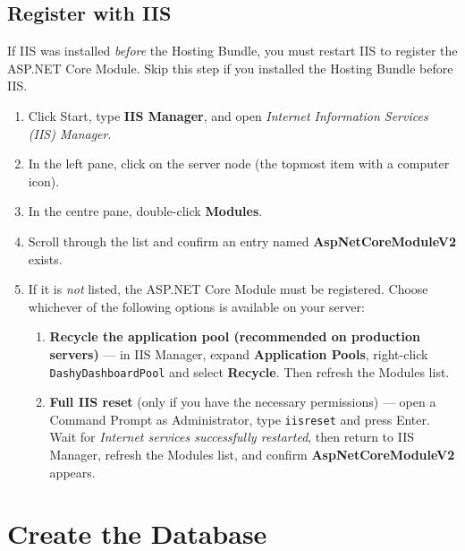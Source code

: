 \documentclass[12pt,a4paper]{report}
\begin{document}
\section{Register with IIS}
\begin{warnbox}
If IIS was installed \emph{before} the Hosting Bundle, you must restart IIS to register the
ASP.NET Core Module. Skip this step if you installed the Hosting Bundle before IIS.
\end{warnbox}

\begin{enumerate}
  \item Click Start, type \textbf{IIS Manager}, and open \emph{Internet Information Services
        (IIS) Manager}.
  \item In the left pane, click on the server node (the topmost item with a computer icon).
  \item In the centre pane, double-click \textbf{Modules}.
  \item Scroll through the list and confirm an entry named \textbf{AspNetCoreModuleV2} exists.
  \item If it is \emph{not} listed, the ASP.NET Core Module must be registered. Choose
        whichever of the following options is available on your server:\nopagebreak
  \begin{enumerate}[label=\alph*.]
    \item \textbf{Recycle the application pool (recommended on production servers)} ---
          in IIS Manager, expand \textbf{Application Pools}, right-click
          \texttt{DashyDashboardPool} and select \textbf{Recycle}. Then refresh the
          Modules list.
    \item \textbf{Full IIS reset} (only if you have the necessary permissions) ---
          open a Command Prompt as Administrator, type \texttt{iisreset} and press Enter.
          Wait for \emph{Internet services successfully restarted}, then return to IIS
          Manager, refresh the Modules list, and confirm \textbf{AspNetCoreModuleV2} appears.
  \end{enumerate}
\end{enumerate}

\chapter{Create the Database}
\end{document}
